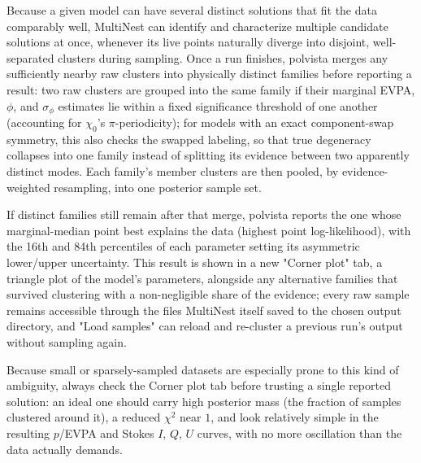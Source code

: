 Because a given model can have several distinct solutions that fit the data comparably well, MultiNest can identify and characterize multiple candidate solutions at once, whenever its live points naturally diverge into disjoint, well-separated clusters during sampling. Once a run finishes, polvista merges any sufficiently nearby raw clusters into physically distinct families before reporting a result: two raw clusters are grouped into the same family if their marginal EVPA, $\phi$, and $\sigma_\phi$ estimates lie within a fixed significance threshold of one another (accounting for $\chi_0$'s $\pi$-periodicity); for models with an exact component-swap symmetry, this also checks the swapped labeling, so that true degeneracy collapses into one family instead of splitting its evidence between two apparently distinct modes. Each family's member clusters are then pooled, by evidence-weighted resampling, into one posterior sample set.

If distinct families still remain after that merge, polvista reports the one whose marginal-median point best explains the data (highest point log-likelihood), with the 16th and 84th percentiles of each parameter setting its asymmetric lower/upper uncertainty. This result is shown in a new "Corner plot" tab, a triangle plot of the model's parameters, alongside any alternative families that survived clustering with a non-negligible share of the evidence; every raw sample remains accessible through the files MultiNest itself saved to the chosen output directory, and "Load samples" can reload and re-cluster a previous run's output without sampling again.

Because small or sparsely-sampled datasets are especially prone to this kind of ambiguity, always check the Corner plot tab before trusting a single reported solution: an ideal one should carry high posterior mass (the fraction of samples clustered around it), a reduced $\chi^2$ near $1$, and look relatively simple in the resulting $p$/EVPA and Stokes $I$, $Q$, $U$ curves, with no more oscillation than the data actually demands.
